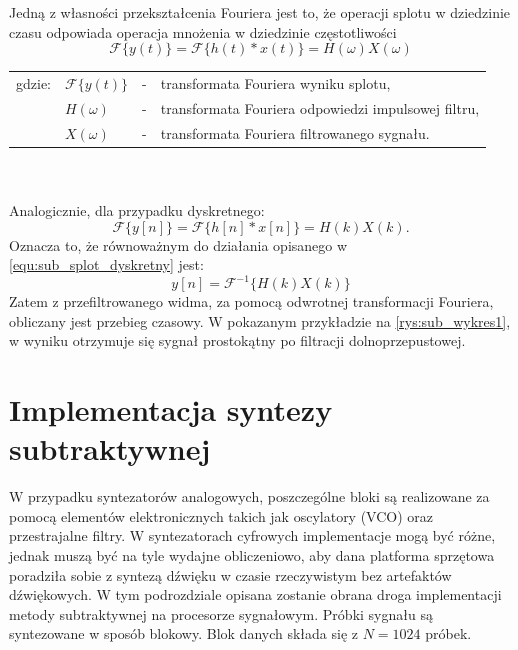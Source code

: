 Jedną z własności przekształcenia Fouriera jest to, że operacji splotu w dziedzinie czasu odpowiada operacja mnożenia w dziedzinie częstotliwości
\begin{equation} \label{equ:sub_splot_twierdzenie}
\mathcal{F}\{y(t)\} = \mathcal{F}\{h(t)*x(t)\} = H(\omega) X(\omega)
\end{equation}
\begin{tabular}{ l l l l}
	gdzie: & $\mathcal{F}\{y(t)\}$ &  - & transformata Fouriera wyniku splotu, \\
	&	$ H(\omega)$ & - &  transformata Fouriera odpowiedzi impulsowej filtru,\\
	&	$X(\omega)$ & - &  transformata Fouriera filtrowanego sygnału.\\
	
\end{tabular} \\ \\
Analogicznie, dla przypadku dyskretnego:
\begin{equation} \label{equ:sub_splot_twierdzenie_dyskretne}
\mathcal{F}\{y[n]\} = \mathcal{F}\{h[n]*x[n]\} = H(k) X(k).
\end{equation}
Oznacza to, że równoważnym do działania opisanego w \ref{equ:sub_splot_dyskretny} jest:
\begin{equation} \label{equ:sub_splot_dyskretny2}
y[n] = \mathcal{F}^{-1}\{ H(k) X(k)\} 
\end{equation}
Zatem z przefiltrowanego widma, za pomocą odwrotnej transformacji Fouriera, obliczany jest przebieg czasowy. W pokazanym przykładzie na \ref{rys:sub_wykres1}, w wyniku otrzymuje się sygnał prostokątny po filtracji dolnoprzepustowej.
\section{Implementacja syntezy subtraktywnej}
W przypadku syntezatorów analogowych, poszczególne bloki są realizowane za pomocą elementów elektronicznych takich jak oscylatory (VCO) oraz przestrajalne filtry. W syntezatorach cyfrowych implementacje mogą być różne, jednak muszą być na tyle wydajne obliczeniowo, aby dana platforma sprzętowa poradziła sobie z syntezą dźwięku w czasie rzeczywistym bez artefaktów dźwiękowych. W tym podrozdziale opisana zostanie obrana droga implementacji metody subtraktywnej na procesorze sygnałowym. 
Próbki sygnału są syntezowane w sposób blokowy. Blok danych składa się z $N=1024$ próbek.



